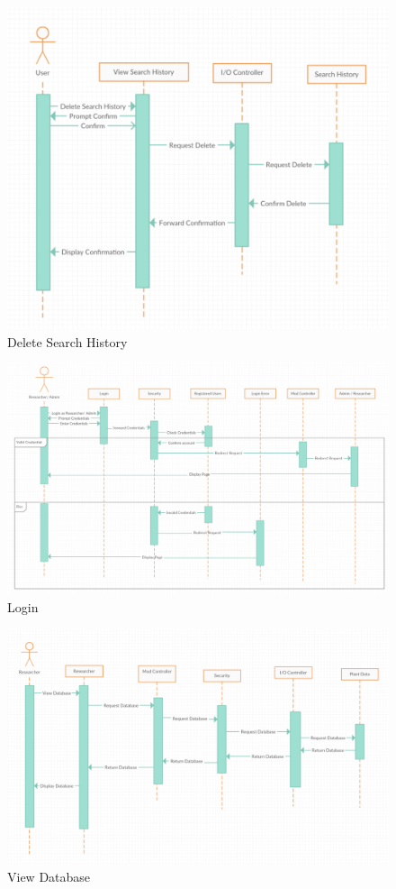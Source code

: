 \documentclass[]{article}
\begin{document}
\begin{figure}[h!]
\centering
\includegraphics[scale=0.6]{DeleteSearchHistory.png}
\caption{Delete Search History}
\label{fig:s3}
\end{figure}

\begin{figure}[h!]
\centering
\includegraphics[scale=0.42]{Login.png}
\caption{Login}
\label{fig:s4}
\end{figure}

\begin{figure}[h!]
\centering
\includegraphics[scale=0.48]{viewdatabase.png}
\caption{View Database}
\label{fig:s5}
\end{figure}
\end{document}
